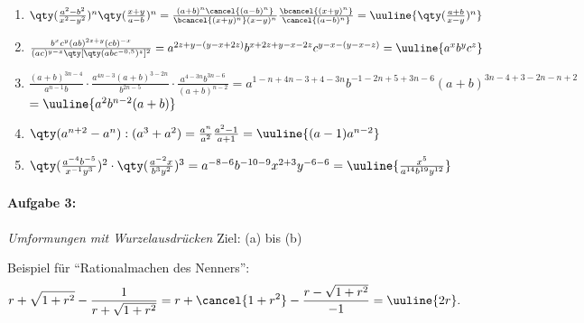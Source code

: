 \begin{enumerate}[label=(\alph*)]
    \item $\qty(\frac{a^2-b^2}{x^2-y^2})^n\qty(\frac{x+y}{a-b})^n = \frac{(a+b)^n \cancel{(a-b)^n}}{\bcancel{(x+y)^n}(x-y)^n} \frac{\bcancel{(x+y)^n}}{\cancel{(a-b)^n}} = \uuline{\qty(\frac{a+b}{x-y})^n}$
    \item $\frac{b^xc^y(ab)^{2z+y}(cb)^{-x}}{(ac)^{y-x}\qty[\qty(abc^{-0,5})^z]^2} = a^{2z + y -(y-x+2z)} b^{x+2z+y-x-2z} c^{y-x-(y-x-z)} = \uuline{a^x b^y c^z}$
    \item $\frac{(a+b)^{3n-4}}{a^{n-1}b}\cdot\frac{a^{4n-3}(a+b)^{3-2n}}{b^{2n-5}}\cdot\frac{a^{4-3n}b^{3n-6}}{(a+b)^{n-2}} = a^{1-n+4n-3+4-3n} b^{-1-2n+5+3n-6} (a+b)^{3n-4+3-2n-n+2} $ \\
    $= \uuline{a^2 b^{n-2}(a+b)}$
    \item $\qty(a^{n+2}-a^n):(a^3+a^2) = \frac{a^n}{a^2}\frac{a^2-1}{a+1} = \uuline{(a-1) a^{n-2}}$
    \item $\qty(\frac{a^{-4}b^{-5}}{x^{-1}y^3})^2\cdot\qty(\frac{a^{-2}x}{b^3y^2})^3 = a^{-8-6} b^{-10-9} x^{2+3} y^{-6-6} = \uuline{\frac{x^5}{a^{14} b^{19} y^{12}}}$
\end{enumerate}
%
\newpage
\paragraph{Aufgabe 3: } \emph{Umformungen mit Wurzelausdrücken} \hfill Ziel: (a) bis (b)\\[0.2cm]

Beispiel für ``Rationalmachen des Nenners'':
\begin{align*}
    r + \sqrt{1+r^2} - \frac{1}{r+\sqrt{1+r^2}} = r + \cancel{1+r^2} - \frac{r-\sqrt{1+r^2}}{-1} = \uuline{2r}.
\end{align*}

